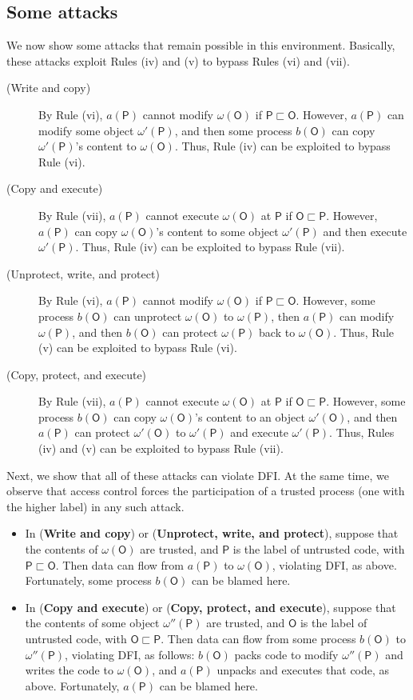 \documentclass{sigplanconf}
\newcommand{\labp}{\mathsf P}
\newcommand{\labo}{\mathsf O}
\begin{document}
\subsection{Some attacks}\label{vista}
We now show some attacks that remain possible in this environment. Basically, these attacks exploit Rules (iv) and (v) to bypass Rules (vi) and (vii). \begin{description}
\item[{\rm (}Write and copy{\rm )}] By Rule (vi), $a(\labp)$ cannot
  modify $\omega(\labo)$ if $\labp \sqsubset \labo$. However, $a(\labp)$ can modify 
  some object $\omega'(\labp)$, and then some process $b(\labo)$ can copy $\omega'(\labp)$'s content to $\omega(\labo)$. Thus, Rule (iv) can be exploited to bypass Rule (vi).
\item[{\rm (}Copy and execute{\rm )}] By Rule (vii), $a(\labp)$ cannot
  execute $\omega(\labo)$ at $\labp$ if $\labo \sqsubset \labp$. However, $a(\labp)$ can copy $\omega(\labo)$'s content to some object $\omega'(\labp)$ and then execute $\omega'(\labp)$. Thus, Rule (iv) can be exploited to bypass Rule (vii).
\item[{\rm (}Unprotect, write, and protect{\rm )}] By Rule (vi), $a(\labp)$ cannot
  modify $\omega(\labo)$ if $\labp \sqsubset \labo$. However, some process $b(\labo)$
  can unprotect $\omega(\labo)$ to $\omega(\labp)$, then $a(\labp)$ can modify 
   $\omega(\labp)$, and then $b(\labo)$ can protect $\omega(\labp)$ back to $\omega(\labo)$. Thus, Rule (v) can be exploited to bypass Rule (vi).
\item[{\rm (}Copy, protect, and execute{\rm )}] By Rule (vii), $a(\labp)$ cannot
  execute $\omega(\labo)$ at $\labp$ if $\labo \sqsubset \labp$. However, some process $b(\labo)$ can copy $\omega(\labo)$'s content to an object $\omega'(\labo)$, and then $a(\labp)$ can protect
  $\omega'(\labo)$ to $\omega'(\labp)$ and execute $\omega'(\labp)$. Thus, Rules (iv) and (v) can be exploited to bypass Rule (vii).
\end{description}
Next, we show that all of these attacks can violate DFI. At the same time, we observe that access
control forces the participation of a trusted process (one with the higher label) in
any such attack. 
\begin{itemize}
\item In ({\bf Write and copy}) or ({\bf Unprotect, write, and protect}), suppose that the contents of $\omega(\labo)$ are trusted, and $\labp$ is the label of untrusted code,  with $\labp \sqsubset \labo$. Then data can flow from $a(\labp)$ to $\omega(\labo)$, violating DFI, as above. Fortunately, some process $b(\labo)$ can be blamed here.
\item In ({\bf Copy and execute}) or ({\bf Copy, protect, and execute}), suppose that the contents of some object $\omega''(\labp)$ are trusted, and $\labo$ is the label of untrusted code, with $\labo \sqsubset \labp$. Then data can flow from some process $b(\labo)$  to $\omega''(\labp)$, violating DFI, as follows: $b(\labo)$ packs code to modify $\omega''(\labp)$ and writes the code to $\omega(\labo)$, and $a(\labp)$ unpacks and executes that code, as above. Fortunately, $a(\labp)$ can be blamed here.
\end{itemize}
\end{document}
